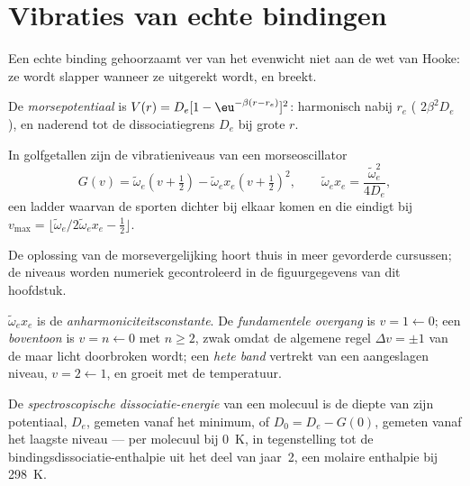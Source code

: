 \section{Vibraties van echte bindingen}\label{sec:b3:rovibrational-spectroscopy:real-bonds}

Een echte binding gehoorzaamt ver van het evenwicht niet aan de wet van
Hooke: ze wordt slapper wanneer ze uitgerekt wordt, en breekt.

\begin{definition}[Morsepotentiaal]\label{def:b3:rovibrational-spectroscopy:morse}
De \emph{morsepotentiaal} is $V(r) = D_e[1 -
\eu^{-\beta(r - r_e)}]^2$: harmonisch nabij $r_e$ ( $2\beta^2D_e$), en
naderend tot de dissociatiegrens $D_e$ bij grote $r$.
\end{definition}

\begin{proposition}\label{prop:b3:rovibrational-spectroscopy:morse-levels}
In golfgetallen zijn de vibratieniveaus van een morseoscillator
\[
G(v) = \tilde\omega_e(v + \tfrac12) - \tilde\omega_ex_e(v + \tfrac12)^2, \qquad
\tilde\omega_ex_e = \frac{\tilde\omega_e^2}{4D_e},
\]
een ladder waarvan de sporten dichter bij elkaar komen en die eindigt bij $v_{\max} = \lfloor\tilde\omega_e/
2\tilde\omega_ex_e - \frac12\rfloor$.
\end{proposition}
\admitted

De oplossing van de morsevergelijking hoort thuis in meer gevorderde
cursussen; de niveaus worden numeriek gecontroleerd in de figuurgegevens
van dit hoofdstuk.

\begin{definition}\label{def:b3:rovibrational-spectroscopy:anharmonic}
$\tilde\omega_ex_e$ is de \emph{anharmoniciteitsconstante}.
De \emph{fundamentele overgang}
is $v = 1 \leftarrow 0$; een \emph{boventoon} is $v = n \leftarrow 0$
met $n \ge 2$, zwak omdat de algemene regel $\Delta v = \pm1$ van de
 maar licht doorbroken wordt; een
\emph{hete band} vertrekt
van een aangeslagen niveau, $v = 2 \leftarrow 1$, en groeit met de temperatuur.
\end{definition}

\begin{definition}\label{def:b3:rovibrational-spectroscopy:dissociation}
De \emph{spectroscopische dissociatie-energie}
van een molecuul is de diepte van zijn potentiaal, $D_e$, gemeten vanaf het
minimum, of $D_0 = D_e - G(0)$, gemeten vanaf het laagste niveau --- per
molecuul bij \qty{0}{K}, in tegenstelling tot de
bindingsdissociatie-enthalpie uit het deel van jaar~2, een molaire
enthalpie bij \qty{298}{K}.
\end{definition}

